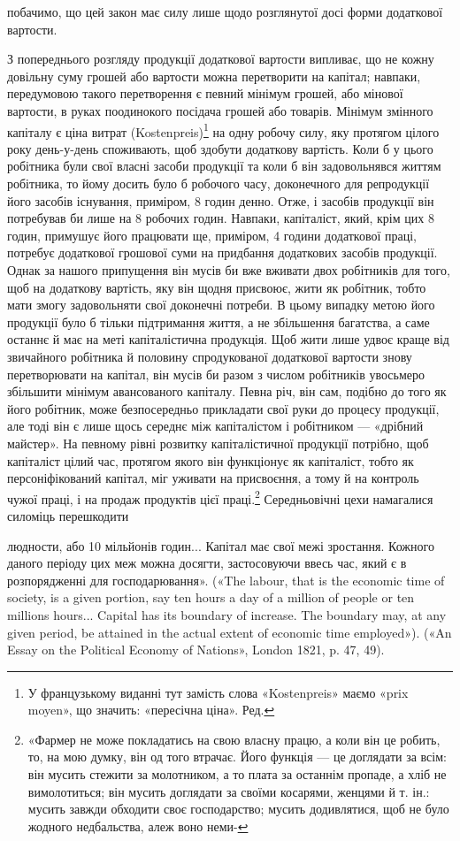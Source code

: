 побачимо, що цей закон має силу лише щодо розглянутої досі
форми додаткової вартости.

З попереднього розгляду продукції додаткової вартости випливає,
що не кожну довільну суму грошей або вартости можна
перетворити на капітал; навпаки, передумовою такого перетворення
є певний мінімум грошей, або мінової вартости, в руках
поодинокого посідача грошей або товарів. Мінімум змінного капіталу
є ціна витрат (Kostenpreis)\footnote*{
У французькому виданні тут замість слова «Kostenpreis» маємо
«prix moyen», що значить: «пересічна ціна». Ред.
} на одну робочу силу, яку протягом
цілого року день-у-день споживають, щоб здобути додаткову
вартість. Коли б у цього робітника були свої власні засоби
продукції та коли б він задовольнявся життям робітника,
то йому досить було б робочого часу, доконечного для репродукції
його засобів існування, приміром, 8 годин денно. Отже, і
засобів продукції він потребував би лише на 8 робочих годин.
Навпаки, капіталіст, який, крім цих 8 годин, примушує його
працювати ще, приміром, 4 години додаткової праці, потребує
додаткової грошової суми на придбання додаткових засобів продукції.
Однак за нашого припущення він мусів би вже вживати
двох робітників для того, щоб на додаткову вартість, яку він
щодня присвоює, жити як робітник, тобто мати змогу задовольняти
свої доконечні потреби. В цьому випадку метою його продукції
було б тільки підтримання життя, а не збільшення багатства,
а саме останнє й має на меті капіталістична продукція.
Щоб жити лише удвоє краще від звичайного робітника й половину
спродукованої додаткової вартости знову перетворювати
на капітал, він мусів би разом з числом робітників увосьмеро
збільшити мінімум авансованого капіталу. Певна річ, він сам,
подібно до того як його робітник, може безпосередньо прикладати
свої руки до процесу продукції, але тоді він є лише щось середнє
між капіталістом і робітником — «дрібний майстер». На певному
рівні розвитку капіталістичної продукції потрібно, щоб капіталіст
цілий час, протягом якого він функціонує як капіталіст,
тобто як персоніфікований капітал, міг уживати на присвоєння,
а тому й на контроль чужої праці, і на продаж продуктів цієї
праці.\footnote{
«Фармер не може покладатись на свою власну працю, а коли
він це робить, то, на мою думку, він од того втрачає. Його функція — це
доглядати за всім: він мусить стежити за молотником, а то плата за останнім
пропаде, а хліб не вимолотиться; він мусить доглядати за своїми
косарями, женцями й т. ін.: мусить завжди обходити своє господарство;
мусить додивлятися, щоб не було жодного недбальства, алеж воно неми-
} Середньовічні цехи намагалися силоміць перешкодити

людности, або 10 мільйонів годин... Капітал має свої межі зростання.
Кожного даного періоду цих меж можна досягти, застосовуючи ввесь
час, який є в розпорядженні для господарювання». («The labour, that
is the economic time of society, is a given portion, say ten hours a day of
a million of people or ten millions hours... Capital has its boundary of increase.
The boundary may, at any given period, be attained in the actual
extent of economic time employed»). («An Essay on the Political Economy
of Nations», London 1821, p. 47, 49).